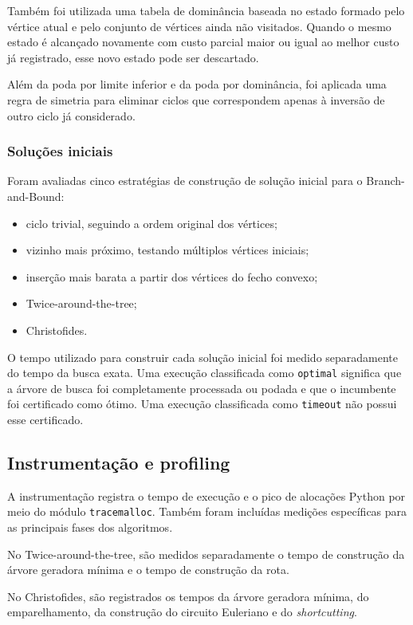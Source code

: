 \documentclass[12pt]{article}
\begin{document}
Também foi utilizada uma tabela de dominância baseada no estado formado pelo vértice atual e pelo conjunto de vértices ainda não visitados. Quando o mesmo estado é alcançado novamente com custo parcial maior ou igual ao melhor custo já registrado, esse novo estado pode ser descartado.

Além da poda por limite inferior e da poda por dominância, foi aplicada uma regra de simetria para eliminar ciclos que correspondem apenas à inversão de outro ciclo já considerado.

\subsubsection{Soluções iniciais}

Foram avaliadas cinco estratégias de construção de solução inicial para o Branch-and-Bound:
\begin{itemize}
  \item ciclo trivial, seguindo a ordem original dos vértices;
  \item vizinho mais próximo, testando múltiplos vértices iniciais;
  \item inserção mais barata a partir dos vértices do fecho convexo;
  \item Twice-around-the-tree;
  \item Christofides.
\end{itemize}

O tempo utilizado para construir cada solução inicial foi medido separadamente do tempo da busca exata. Uma execução classificada como \texttt{optimal} significa que a árvore de busca foi completamente processada ou podada e que o incumbente foi certificado como ótimo. Uma execução classificada como \texttt{timeout} não possui esse certificado.

\subsection{Instrumentação e profiling}

A instrumentação registra o tempo de execução e o pico de alocações Python por meio do módulo \texttt{tracemalloc}. Também foram incluídas medições específicas para as principais fases dos algoritmos.

No Twice-around-the-tree, são medidos separadamente o tempo de construção da árvore geradora mínima e o tempo de construção da rota.

No Christofides, são registrados os tempos da árvore geradora mínima, do emparelhamento, da construção do circuito Euleriano e do \emph{shortcutting}.
\end{document}
